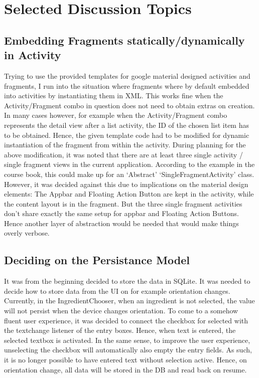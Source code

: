 \documentclass[a4paper,11pt,twoside]{article}
\begin{document}
\section{Selected Discussion Topics}

\subsection{Embedding Fragments statically/dynamically in Activity}
Trying to use the provided templates for google material designed activities and
fragments, I run into the situation where fragments where by default embedded into
activities by instantiating them in XML. This works fine when the Activity/Fragment
combo in question does not need to obtain extras on creation. In many cases however,
for example when the Activity/Fragment combo represents the detail view after a
list activity, the ID of the chosen list item has to be obtained. Hence, the given
template code had to be modified for dynamic instantiation of the fragment from
within the activity.
During planning for the above modification, it was noted that there are at least
three single activity / single fragment views in the current application. According
to the example in the course book, this could make up for an `Abstract'
`SingleFragmentActivity' class. However, it was decided against this due to
implications on the material design elements: The Appbar and Floating Action Button
are kept in the activity, while the content layout is in the fragment. But the
three single fragment activities don't share exactly the same setup for appbar
and Floating Action Buttons. Hence another layer of abstraction would be needed that
would make things overly verbose.

\subsection{Deciding on the Persistance Model} It was from the beginning decided
to store the data in SQLite. It was needed to decide how to store data from the
UI on for example orientation changes. Currently, in the IngredientChooser, when
an ingredient is not selected, the value will not persist when the device
changes orientation. To come to a somehow fluent user experience, it was decided
to connect the checkbox for selected with the textchange listener of the entry
boxes. Hence, when text is entered, the selected textbox is activated. In the
same sense, to improve the user experience, unselecting the checkbox will
automatically also empty the entry fields. As such, it is no longer possible to
have entered text without selection active. Hence, on orientation change, all
data will be stored in the DB and read back on resume.
\end{document}
